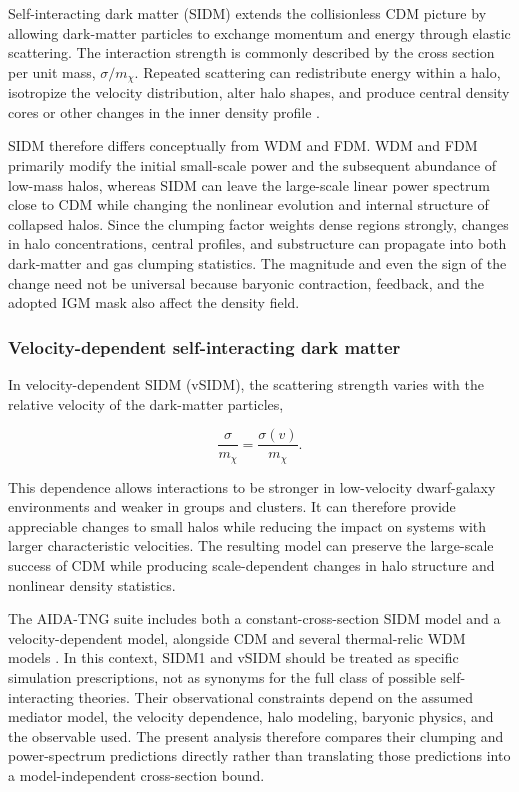Self-interacting dark matter (SIDM) extends the collisionless CDM picture by allowing dark-matter particles to exchange momentum and energy through elastic scattering. The interaction strength is commonly described by the cross section per unit mass, $\sigma/m_\chi$. Repeated scattering can redistribute energy within a halo, isotropize the velocity distribution, alter halo shapes, and produce central density cores or other changes in the inner density profile \cite{tulin2018sidm}.

SIDM therefore differs conceptually from WDM and FDM. WDM and FDM primarily modify the initial small-scale power and the subsequent abundance of low-mass halos, whereas SIDM can leave the large-scale linear power spectrum close to CDM while changing the nonlinear evolution and internal structure of collapsed halos. Since the clumping factor weights dense regions strongly, changes in halo concentrations, central profiles, and substructure can propagate into both dark-matter and gas clumping statistics. The magnitude and even the sign of the change need not be universal because baryonic contraction, feedback, and the adopted IGM mask also affect the density field.

\subsubsection{Velocity-dependent self-interacting dark matter}

In velocity-dependent SIDM (vSIDM), the scattering strength varies with the relative velocity of the dark-matter particles,

$$
\frac{\sigma}{m_\chi}=\frac{\sigma(v)}{m_\chi}.
$$

This dependence allows interactions to be stronger in low-velocity dwarf-galaxy environments and weaker in groups and clusters. It can therefore provide appreciable changes to small halos while reducing the impact on systems with larger characteristic velocities. The resulting model can preserve the large-scale success of CDM while producing scale-dependent changes in halo structure and nonlinear density statistics.

The AIDA-TNG suite includes both a constant-cross-section SIDM model and a velocity-dependent model, alongside CDM and several thermal-relic WDM models \cite{despali2025aidatng}. In this context, SIDM1 and vSIDM should be treated as specific simulation prescriptions, not as synonyms for the full class of possible self-interacting theories. Their observational constraints depend on the assumed mediator model, the velocity dependence, halo modeling, baryonic physics, and the observable used. The present analysis therefore compares their clumping and power-spectrum predictions directly rather than translating those predictions into a model-independent cross-section bound.

